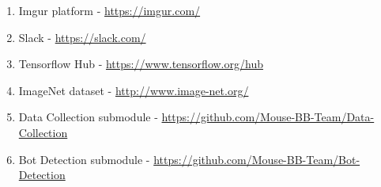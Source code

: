 \begin{enumerate}
    \item Imgur platform - \url{https://imgur.com/}\label{itm:imgur}
    \item Slack - \url{https://slack.com/}\label{itm:slack}
    \item Tensorflow Hub - \url{https://www.tensorflow.org/hub}\label{itm:tensorflow-hub}
    \item ImageNet dataset - \url{http://www.image-net.org/}\label{itm:image-net}
    \item Data Collection submodule - \url{https://github.com/Mouse-BB-Team/Data-Collection}\label{itm:data-collection}
    \item Bot Detection submodule - \url{https://github.com/Mouse-BB-Team/Bot-Detection}\label{itm:bot-detection}
\end{enumerate}
